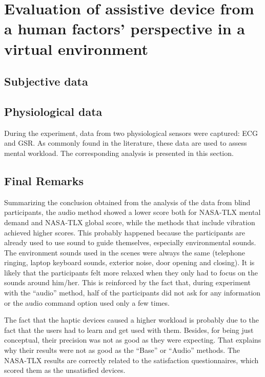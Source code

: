 \section{Evaluation of assistive device from a human factors’ perspective in a virtual environment}
\label{sec:results_obj_1}

\subsection{Subjective data}




\subsection{Physiological data}

During the experiment, data from two physiological sensors were captured: ECG and GSR. As commonly found in the literature, these data are used to assess mental workload. The corresponding analysis is presented in this section.





\subsection{Final Remarks}

Summarizing the conclusion obtained from the analysis of the data from blind participants, the audio method showed a lower score both for NASA-TLX mental demand and NASA-TLX global score, while the methods that include vibration achieved higher scores. This probably happened because the participants are already used to use sound to guide themselves, especially environmental sounds. The environment sounds used in the scenes were always the same (telephone ringing, laptop keyboard sounds, exterior noise, door opening and closing). It is likely that the participants felt more relaxed when they only had to focus on the sounds around him/her. This is reinforced by the fact that, during experiment with the “audio” method, half of the participants did not ask for any information or the audio command option used only a few times.

The fact that the haptic devices caused a higher workload is probably due to the fact that the users had to learn and get used with them. Besides, for being just conceptual, their precision was not as good as they were expecting. That explains why their results were not as good as the “Base” or “Audio” methods. The NASA-TLX results are correctly related to the satisfaction questionnaires, which scored them as the unsatisfied devices.

